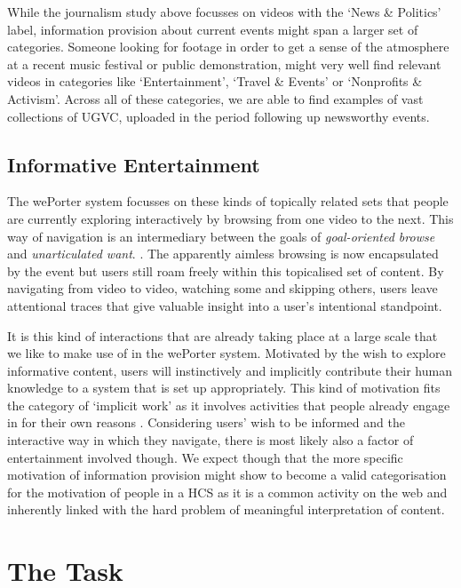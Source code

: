 While the journalism study above focusses on videos with the `News \& Politics' label, information provision about current events might span a larger set of categories. Someone looking for footage in order to get a sense of the atmosphere at a recent music festival or public demonstration, might very well find relevant videos in categories like `Entertainment', `Travel \& Events' or `Nonprofits \& Activism'. Across all of these categories, we are able to find examples of vast collections of UGVC, uploaded in the period following up newsworthy events.

\subsection{Informative Entertainment}

The wePorter system focusses on these kinds of topically related sets that people are currently exploring interactively by browsing from one video to the next. This way of navigation is an intermediary between the goals of \textit{goal-oriented browse} and \textit{unarticulated want}. . The apparently aimless browsing is now encapsulated by the event but users still roam freely within this topicalised set of content. By navigating from video to video, watching some and skipping others, users leave attentional traces that give valuable insight into a user's intentional standpoint.

It is this kind of interactions that are already taking place at a large scale that we like to make use of in the wePorter system. Motivated by the wish to explore informative content, users will instinctively and implicitly contribute their human knowledge to a system that is set up appropriately. This kind of motivation fits the category of `implicit work' as it involves activities that people already engage in for their own reasons \cite{Quinn:2011us}. Considering users' wish to be informed and the interactive way in which they navigate, there is most likely also a factor of entertainment involved though. We expect though that the more specific motivation of information provision might show to become a valid categorisation for the motivation of people in a HCS as it is a common activity on the web and inherently linked with the hard problem of meaningful interpretation of content.

\section{The Task}
\label{sec:weporter_task}

